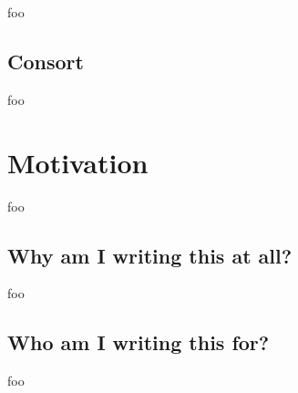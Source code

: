 foo

\subsection{Consort}

foo

\section{Motivation}

foo

\subsection{Why am I writing this at all?}

foo

\subsection{Who am I writing this for?}

foo
